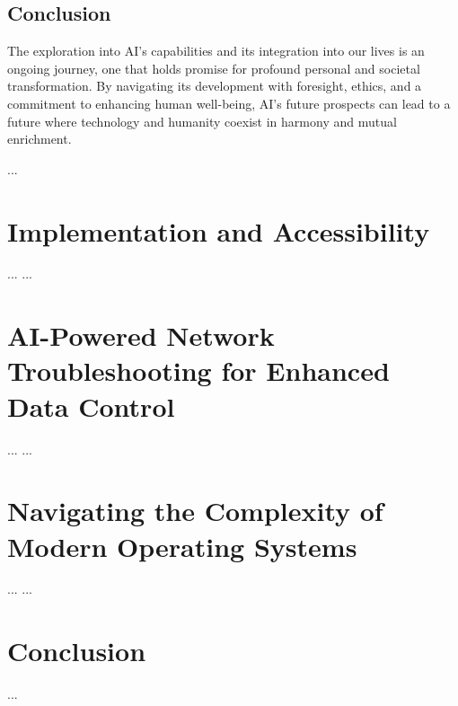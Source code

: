 \documentclass[12pt]{article}
\begin{document}
\subsection*{Conclusion}
The exploration into AI's capabilities and its integration into our lives is an ongoing journey, one that holds promise for profound personal and societal transformation. By navigating its development with foresight, ethics, and a commitment to enhancing human well-being, AI's future prospects can lead to a future where technology and humanity coexist in harmony and mutual enrichment.

...
\section*{Implementation and Accessibility}
...
...

\section{AI-Powered Network Troubleshooting for Enhanced Data Control}
...
...

\section{Navigating the Complexity of Modern Operating Systems}
...
...

\section*{Conclusion}
...
\end{document}
